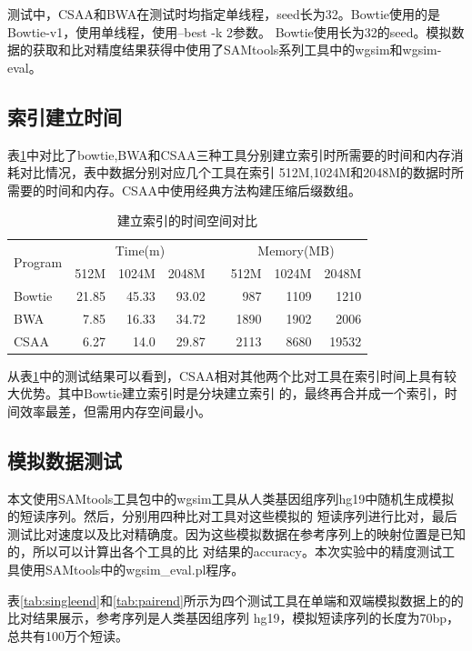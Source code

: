 \documentclass[UTF8,adobefonts]{ctexart}
\begin{document}
测试中，CSAA和BWA在测试时均指定单线程，seed长为32。Bowtie使用的是Bowtie-v1，使用单线程，使用--best -k 2参数。
Bowtie使用长为32的seed。模拟数据的获取和比对精度结果获得中使用了SAMtools系列工具中的wgsim和wgsim-eval。

\subsection{索引建立时间}
表\ref{tab:tab1}中对比了bowtie,BWA和CSAA三种工具分别建立索引时所需要的时间和内存消耗对比情况，表中数据分别对应几个工具在索引
512M,1024M和2048M的数据时所需要的时间和内存。CSAA中使用经典方法构建压缩后缀数组。

\begin{table}[htbp]
    \caption{建立索引的时间空间对比}
    \label{tab:tab1}
    \centering
    \begin{tabular}{lrrrp{2ex}rrr}
        \hline
        \multirow{2}{*}{Program} & \multicolumn{3}{c}{Time(m)}& & \multicolumn{3}{c}{Memory(MB)}\\
        \cline{2-4}
        \cline{6-8}
        & 512M &1024M &2048M& &512M &1024M &2048M\\
        \hline
        Bowtie&21.85 &45.33 &93.02& &987 &1109 &1210 \\
        BWA&7.85 &16.33 &34.72& &1890 &1902 &2006 \\
        CSAA&6.27 &14.0 &29.87& &2113 &8680 &19532 \\
        \hline
    \end{tabular}
\end{table}

从表\ref{tab:tab1}中的测试结果可以看到，CSAA相对其他两个比对工具在索引时间上具有较大优势。其中Bowtie建立索引时是分块建立索引
的，最终再合并成一个索引，时间效率最差，但需用内存空间最小。

\subsection{模拟数据测试}
本文使用SAMtools工具包中的wgsim工具从人类基因组序列hg19中随机生成模拟的短读序列。然后，分别用四种比对工具对这些模拟的
短读序列进行比对，最后测试比对速度以及比对精确度。因为这些模拟数据在参考序列上的映射位置是已知的，所以可以计算出各个工具的比
对结果的accuracy。本次实验中的精度测试工具使用SAMtools中的wgsim\_eval.pl程序。

表\ref{tab:singleend}和\ref{tab:pairend}所示为四个测试工具在单端和双端模拟数据上的的比对结果展示，参考序列是人类基因组序列
hg19，模拟短读序列的长度为70bp，总共有100万个短读。
\end{document}

